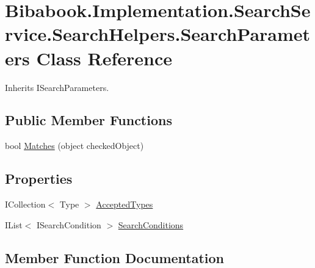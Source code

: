 \hypertarget{class_bibabook_1_1_implementation_1_1_search_service_1_1_search_helpers_1_1_search_parameters}{}\section{Bibabook.\+Implementation.\+Search\+Service.\+Search\+Helpers.\+Search\+Parameters Class Reference}
\label{class_bibabook_1_1_implementation_1_1_search_service_1_1_search_helpers_1_1_search_parameters}


Inherits I\+Search\+Parameters.

\subsection*{Public Member Functions}
\begin{DoxyCompactItemize}
\item 
bool \hyperlink{class_bibabook_1_1_implementation_1_1_search_service_1_1_search_helpers_1_1_search_parameters_a670f17e367dd0d4c6971dc5f98eb8124}{Matches} (object checked\+Object)
\end{DoxyCompactItemize}
\subsection*{Properties}
\begin{DoxyCompactItemize}
\item 
I\+Collection$<$ Type $>$ \hyperlink{class_bibabook_1_1_implementation_1_1_search_service_1_1_search_helpers_1_1_search_parameters_a86003b460cfbe9c5e9898d74ce997953}{Accepted\+Types}
\item 
I\+List$<$ I\+Search\+Condition $>$ \hyperlink{class_bibabook_1_1_implementation_1_1_search_service_1_1_search_helpers_1_1_search_parameters_a413a985ac5992f1bb35aa0ea74ce80ab}{Search\+Conditions}
\end{DoxyCompactItemize}


\subsection{Member Function Documentation}
\hypertarget{class_bibabook_1_1_implementation_1_1_search_service_1_1_search_helpers_1_1_search_parameters_a670f17e367dd0d4c6971dc5f98eb8124}{}
